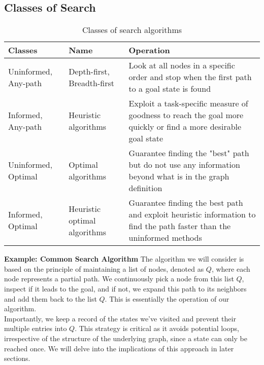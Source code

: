 \documentclass[a4paper,UKenglish,cleveref, autoref, thm-restate]{qlinhta}
\begin{document}
    \subsection{Classes of Search}
    \begin{table}[h]
        \centering
        \begin{tabular}{|p{4cm}|p{4cm}|p{6cm}|}
            \hline
            \textbf{Classes}     & \textbf{Name}                & \textbf{Operation}                                                                                                    \\
            \hline
            Uninformed, Any-path & Depth-first, Breadth-first   & Look at all nodes in a specific order and stop when the first path to a goal state is found                           \\
            \hline
            Informed, Any-path   & Heuristic algorithms         & Exploit a task-specific measure of goodness to reach the goal more quickly or find a more desirable goal state        \\
            \hline
            Uninformed, Optimal  & Optimal algorithms           & Guarantee finding the "best" path but do not use any information beyond what is in the graph definition               \\
            \hline
            Informed, Optimal    & Heuristic optimal algorithms & Guarantee finding the best path and exploit heuristic information to find the path faster than the uninformed methods \\
            \hline
        \end{tabular}
        \caption{Classes of search algorithms}
        \label{tab:search_classes}
    \end{table}

    \textbf{Example: Common Search Algorithm} The algorithm we will consider is based on the principle of maintaining a list of nodes, denoted as $Q$, where each node represents a partial path. We continuously pick a node from this list $Q$, inspect if it leads to the goal, and if not, we expand this path to its neighbors and add them back to the list $Q$. This is essentially the operation of our algorithm.\\

    Importantly, we keep a record of the states we've visited and prevent their multiple entries into $Q$. This strategy is critical as it avoids potential loops, irrespective of the structure of the underlying graph, since a state can only be reached once. We will delve into the implications of this approach in later sections. \\
\end{document}
